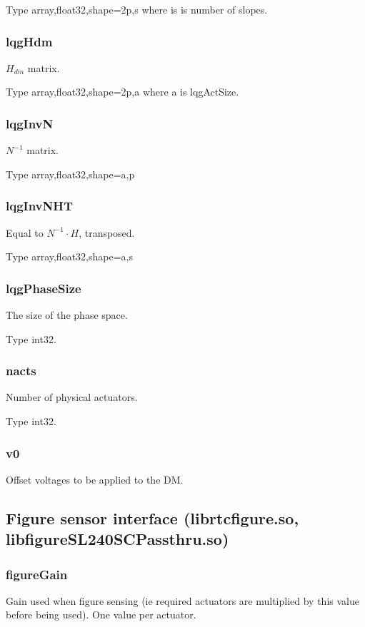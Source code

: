 \documentclass[a4,10pt]{article}
\begin{document}
Type array,float32,shape=2p,s where is is number of slopes.

\subsubsection{lqgHdm}
$H_{dm}$ matrix.

Type array,float32,shape=2p,a where a is lqgActSize.

\subsubsection{lqgInvN}
$N^{-1}$ matrix.

Type array,float32,shape=a,p

\subsubsection{lqgInvNHT}
Equal to $N^{-1}\cdot H$, transposed.

Type array,float32,shape=a,s

\subsubsection{lqgPhaseSize}
The size of the phase space.

Type int32.

\subsubsection{nacts}
Number of physical actuators.

Type int32.

\subsubsection{v0}
Offset voltages to be applied to the DM.




\subsection{Figure sensor interface (librtcfigure.so, libfigureSL240SCPassthru.so)}
\subsubsection{figureGain}
Gain used when figure sensing (ie required actuators are multiplied by
this value before being used).  One value per actuator.
\end{document}
